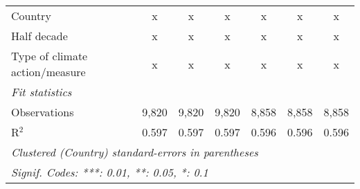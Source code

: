\begin{tabular}{lcccccc}
   Country                                             & x            & x             & x             & x            & x             & x\\  
   Half decade                                         & x            & x             & x             & x            & x             & x\\  
   Type of climate action/measure                      & x            & x             & x             & x            & x             & x\\  
   \midrule \emph{Fit statistics}\\
   Observations                                        & 9,820        & 9,820         & 9,820         & 8,858        & 8,858         & 8,858\\  
   R$^2$                                               & 0.597        & 0.597         & 0.597         & 0.596        & 0.596         & 0.596\\  
   \midrule
   \multicolumn{7}{l}{\emph{Clustered (Country) standard-errors in parentheses}}\\
   \multicolumn{7}{l}{\emph{Signif. Codes: ***: 0.01, **: 0.05, *: 0.1}}\\
\end{tabular}
\par\endgroup


